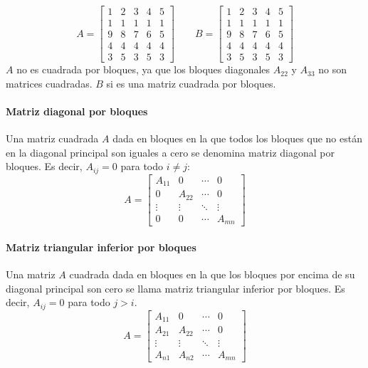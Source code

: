 
\[
  A = \left[\begin{array}{cc|cc|c}
    1 & 2 & 3 & 4 & 5 \\
    1 & 1 & 1 & 1 & 1 \\
    \hline
    9 & 8 & 7 & 6 & 5 \\
    \hline
    4 & 4 & 4 & 4 & 4 \\
    3 & 5 & 3 & 5 & 3
  \end{array}\right] \qquad B = \left[\begin{array}{cc|cc|c}
        1 & 2 & 3 & 4 & 5 \\
    1 & 1 & 1 & 1 & 1 \\
    \hline
    9 & 8 & 7 & 6 & 5 \\
    4 & 4 & 4 & 4 & 4 \\
    \hline
    3 & 5 & 3 & 5 & 3
  \end{array}\right]
\]
\(A\) no es cuadrada por bloques, ya que los bloques diagonales \(A_{22}\) y \(A_{33}\) no son matrices cuadradas. \(B\) si es una matriz cuadrada por bloques.

\paragraph{Matriz diagonal por bloques}

Una matriz cuadrada \(A\) dada en bloques en la que todos los bloques que no están en la diagonal principal son iguales a cero se denomina matriz diagonal por bloques. Es decir, \(A_{ij} = 0\) para todo \(i \neq j\):\[
A = \begin{bmatrix}
  A_{11} & 0 & \cdots & 0 \\
  0 & A_{22} & \cdots & 0 \\
  \vdots & \vdots & \ddots & \vdots \\
  0 & 0 & \cdots & A_{mn}
\end{bmatrix}
\]

\paragraph{Matriz triangular inferior por bloques}

Una matriz \(A\) cuadrada dada en bloques en la que los bloques por encima de su diagonal principal son cero se llama matriz triangular inferior por bloques. Es decir, \(A_{ij} = 0\) para todo \(j > i\).
\[
A = \begin{bmatrix}
  A_{11} & 0 & \cdots & 0 \\
  A_{21} & A_{22} & \cdots & 0 \\
  \vdots & \vdots & \ddots & \vdots \\
  A_{n1} & A_{n2} & \cdots & A_{mn}
\end{bmatrix}
\]

